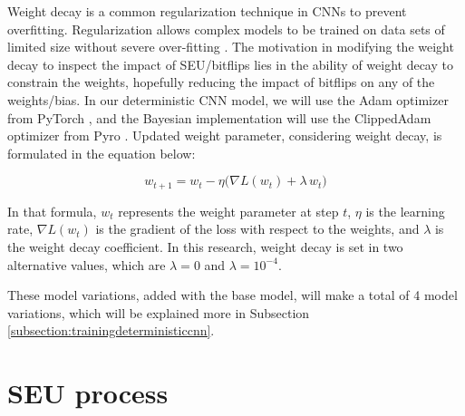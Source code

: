 \documentclass[ %
                    author={Revalda Putawara},
                supervisor={Dr. James Pope},
                    degree={MSc},
                     title={Robustness of Bayesian Neural Networks Design Choices Against Weight and Bias Perturbation Induced by Single Event Upsets (SEUs)},
                      type={},
                      year={2025}]{dissertation}
\begin{document}
\begin{enumerate}[noitemsep, topsep=0pt]
Weight decay is a common regularization technique in CNNs to prevent overfitting. Regularization allows complex models to be trained on data sets of limited size without severe over-fitting \cite{bishoppatternrecognition2007}. The motivation in modifying the weight decay to inspect the impact of SEU/bitflips lies in the ability of weight decay to constrain the weights, hopefully reducing the impact of bitflips on any of the weights/bias. In our deterministic CNN model, we will use the Adam optimizer from PyTorch \cite{kingma2014adam}, and the Bayesian implementation will use the ClippedAdam optimizer from Pyro \cite{computation11050095}. Updated weight parameter, considering weight decay, is formulated in the equation below:

\begin{equation}
\label{eq:clippedadam_update}
w_{t+1} = w_t - \eta \Big( \nabla L(w_t) + \lambda \, w_t \Big)
\end{equation}

In that formula, $w_t$ represents the weight parameter at step $t$, $\eta$ is the learning rate, $\nabla L(w_t)$ is the gradient of the loss with respect to the weights, and $\lambda$ is the weight decay coefficient. In this research, weight decay is set in two alternative values, which are $\lambda=0$ and $\lambda = 10^{-4}$.
\end{enumerate}

These model variations, added with the base model, will make a total of 4 model variations, which will be explained more in Subsection \ref{subsection:trainingdeterministiccnn}.

\section{SEU process}

\end{document}
